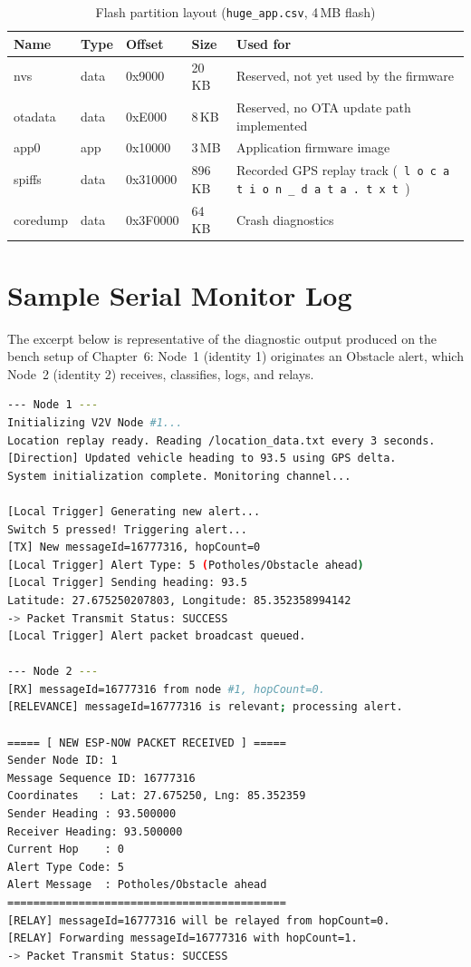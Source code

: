 \documentclass[12pt,a4paper]{report}
\makeatletter
\def\seqinsert{\ifmmode\allowbreak\else\hspace{0pt plus 0.02em}\fi}
\def\seqsplit#1{\SQSPL@scan#1\SQSPL@end}
\def\SQSPL@scan{\futurelet\SQSPL@next\SQSPL@scani}
\def\SQSPL@scani#1{%
  \ifx \SQSPL@end \SQSPL@next \def\SQSPL@process{\@gobble}%
  \else \def\SQSPL@process{\SQSPL@doprocess}\fi%
  \SQSPL@process{#1}}
\def\SQSPL@doprocess#1{#1\SQSPL@insert}
\def\SQSPL@insert{\futurelet\SQSPL@next\SQSPL@doinsert}
\def\SQSPL@doinsert{%
  \ifx \SQSPL@end \SQSPL@next \relax%
  \else \seqinsert \fi%
  \SQSPL@scan}
\makeatother
\begin{document}
\begin{table}[H]
\centering
\caption{Flash partition layout (\texttt{huge\_app.csv}, 4\,MB flash)}
\label{tab:partitions}
\begin{tabular}{@{}p{1.7cm}p{1.4cm}p{1.9cm}p{1.5cm}p{6.9cm}@{}}
\toprule
\textbf{Name} & \textbf{Type} & \textbf{Offset} & \textbf{Size} & \textbf{Used for} \\
\midrule
nvs & data & 0x9000 & 20\,KB & Reserved, not yet used by the firmware \\
otadata & data & 0xE000 & 8\,KB & Reserved, no OTA update path implemented \\
app0 & app & 0x10000 & 3\,MB & Application firmware image \\
spiffs & data & 0x310000 & 896\,KB & Recorded GPS replay track (\texttt{\seqsplit{location\_data.txt}}) \\
coredump & data & 0x3F0000 & 64\,KB & Crash diagnostics \\
\bottomrule
\end{tabular}
\end{table}

\chapter{Sample Serial Monitor Log}
The excerpt below is representative of the diagnostic output produced on the bench setup of Chapter~6: Node~1 (identity 1) originates an Obstacle alert, which Node~2 (identity 2) receives, classifies, logs, and relays.

\begin{lstlisting}[language=bash, caption={Representative Serial monitor excerpt (two boards, 115200 baud)}]
--- Node 1 ---
Initializing V2V Node #1...
Location replay ready. Reading /location_data.txt every 3 seconds.
[Direction] Updated vehicle heading to 93.5 using GPS delta.
System initialization complete. Monitoring channel...

[Local Trigger] Generating new alert...
Switch 5 pressed! Triggering alert...
[TX] New messageId=16777316, hopCount=0
[Local Trigger] Alert Type: 5 (Potholes/Obstacle ahead)
[Local Trigger] Sending heading: 93.5
Latitude: 27.675250207803, Longitude: 85.352358994142
-> Packet Transmit Status: SUCCESS
[Local Trigger] Alert packet broadcast queued.

--- Node 2 ---
[RX] messageId=16777316 from node #1, hopCount=0.
[RELEVANCE] messageId=16777316 is relevant; processing alert.

===== [ NEW ESP-NOW PACKET RECEIVED ] =====
Sender Node ID: 1
Message Sequence ID: 16777316
Coordinates   : Lat: 27.675250, Lng: 85.352359
Sender Heading : 93.500000
Receiver Heading: 93.500000
Current Hop    : 0
Alert Type Code: 5
Alert Message  : Potholes/Obstacle ahead
===========================================
[RELAY] messageId=16777316 will be relayed from hopCount=0.
[RELAY] Forwarding messageId=16777316 with hopCount=1.
-> Packet Transmit Status: SUCCESS
\end{lstlisting}
\end{document}
